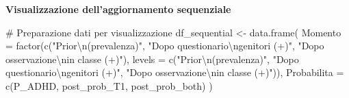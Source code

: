 \documentclass[
  letterpaper,
  DIV=11,
  numbers=noendperiod,
  oneside]{scrreprt}
\newenvironment{Shaded}{\begin{snugshade}}{\end{snugshade}}
\newcommand{\AttributeTok}[1]{\textcolor[rgb]{0.40,0.45,0.13}{#1}}
\newcommand{\CommentTok}[1]{\textcolor[rgb]{0.37,0.37,0.37}{#1}}
\newcommand{\FloatTok}[1]{\textcolor[rgb]{0.68,0.00,0.00}{#1}}
\newcommand{\FunctionTok}[1]{\textcolor[rgb]{0.28,0.35,0.67}{#1}}
\newcommand{\NormalTok}[1]{\textcolor[rgb]{0.00,0.23,0.31}{#1}}
\newcommand{\OtherTok}[1]{\textcolor[rgb]{0.00,0.23,0.31}{#1}}
\newcommand{\SpecialCharTok}[1]{\textcolor[rgb]{0.37,0.37,0.37}{#1}}
\newcommand{\StringTok}[1]{\textcolor[rgb]{0.13,0.47,0.30}{#1}}
\theoremstyle{definition}
\theoremstyle{plain}
\theoremstyle{definition}
\theoremstyle{remark}
\begin{document}
\begin{tcolorbox}
\textbf{Visualizzazione dell'aggiornamento sequenziale}

\begin{Shaded}
\begin{Highlighting}[]
\CommentTok{\# Preparazione dati per visualizzazione}
\NormalTok{df\_sequential }\OtherTok{\textless{}{-}} \FunctionTok{data.frame}\NormalTok{(}
  \AttributeTok{Momento =} \FunctionTok{factor}\NormalTok{(}\FunctionTok{c}\NormalTok{(}\StringTok{"Prior}\SpecialCharTok{\textbackslash{}n}\StringTok{(prevalenza)"}\NormalTok{, }\StringTok{"Dopo questionario}\SpecialCharTok{\textbackslash{}n}\StringTok{genitori (+)"}\NormalTok{, }
                     \StringTok{"Dopo osservazione}\SpecialCharTok{\textbackslash{}n}\StringTok{in classe (+)"}\NormalTok{),}
                   \AttributeTok{levels =} \FunctionTok{c}\NormalTok{(}\StringTok{"Prior}\SpecialCharTok{\textbackslash{}n}\StringTok{(prevalenza)"}\NormalTok{, }\StringTok{"Dopo questionario}\SpecialCharTok{\textbackslash{}n}\StringTok{genitori (+)"}\NormalTok{, }
                              \StringTok{"Dopo osservazione}\SpecialCharTok{\textbackslash{}n}\StringTok{in classe (+)"}\NormalTok{)),}
  \AttributeTok{Probabilita =} \FunctionTok{c}\NormalTok{(P\_ADHD, post\_prob\_T1, post\_prob\_both)}
\NormalTok{)}
\end{Highlighting}
\end{Shaded}

\begin{Shaded}
\end{Shaded}
\end{tcolorbox}
\end{document}
